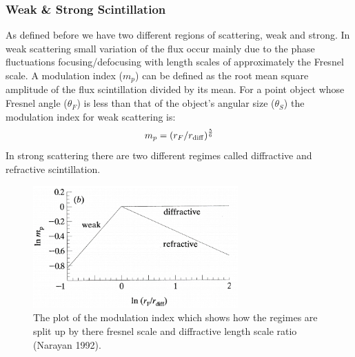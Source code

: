 \documentclass[a4paper, 10pt]{article}
\begin{document}
\subsubsection{Weak \& Strong Scintillation}
As defined before we have two different regions of scattering, weak and strong. In weak scattering small variation of the flux occur mainly due to the phase fluctuations focusing/defocusing with length scales of approximately the Fresnel scale. A modulation index ($m_p$) can be defined as the root mean square amplitude of the flux scintillation divided by its mean. For a point object whose Fresnel angle ($\theta_F$) is less than that of the object's angular size ($\theta_S$) the modulation index for weak scattering is:
\begin{equation}
    m_{p}=(r_{F}/r_{\ce{diff}})^{\frac{5}{6}}
\end{equation}
In strong scattering there are two different regimes called diffractive and refractive scintillation. 
\begin{figure}[H]
\begin{center}
	\includegraphics[width=0.7\textwidth]{scatt1}
	\caption{The plot of the modulation index which shows how the regimes are split up by there fresnel scale and diffractive length scale ratio (Narayan 1992).}
	\label{scatt}
\end{center}
\end{figure}
\end{document}
